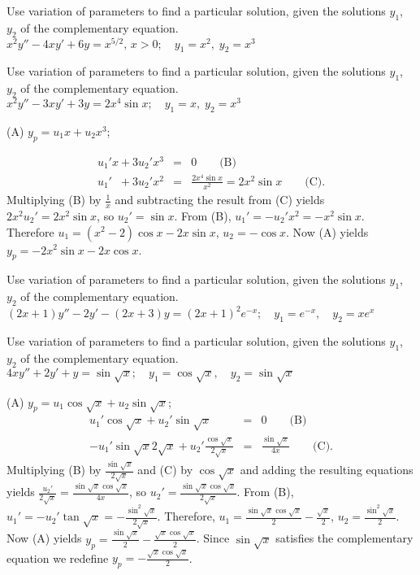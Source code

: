 \documentclass{ximera}
\begin{document}
\begin{problem}\label{exer:5.7.11}
Use variation
of parameters to find a particular solution, given the solutions
$y_1$, $y_2$ of the complementary equation. $x^2y''-4xy'+6y=x^{5/2},\, x > 0;\quad  y_1=x^2,\;  y_2=x^3$
\end{problem}

\begin{problem}\label{exer:5.7.12}
Use variation
of parameters to find a particular solution, given the solutions
$y_1$, $y_2$ of the complementary equation. $x^2y''-3xy'+3y=2x^4\sin x; \quad  y_1=x,\;  y_2=x^3$

\begin{solution}
(A) $y_p=u_1x+u_2x^3$;

\begin{eqnarray*}
u_1'x+3u_2'x^3&=&0\qquad\text{(B)}\\ %
u_1'\phantom{x}+3u_2'x^2&=&\frac{2x^4\sin x}{x^2}=2x^2\sin x \qquad\text{(C)}. %
\end{eqnarray*}
Multiplying (B) by $\frac{1}{x}$ and subtracting
the result from (C) yields $2x^2u_2'=2x^2\sin x$, so
$u_2'=\sin x$. From (B), $u_1'=-u_2'x^2=-x^2\sin x$.
Therefore $u_1=(x^2-2)\cos x-2x\sin x$, $u_2=-\cos x$. Now (A) yields
$y_p=-2x^2\sin x-2x\cos x$.
\end{solution}
\end{problem}

\begin{problem}\label{exer:5.7.13}
Use variation
of parameters to find a particular solution, given the solutions
$y_1$, $y_2$ of the complementary equation. $(2x+1)y''-2y'-(2x+3)y=(2x+1)^2e^{-x}; \quad  y_1=e^{-x},
\quad y_2=xe^x$
\end{problem}

\begin{problem}\label{exer:5.7.14}
Use variation
of parameters to find a particular solution, given the solutions
$y_1$, $y_2$ of the complementary equation. $4xy''+2y'+y=\sin\sqrt x; \quad  y_1=\cos\sqrt x,
\quad y_2=\sin\sqrt x$

\begin{solution}
    (A) $y_p=u_1\cos\sqrt x+u_2\sin\sqrt x$;
\setcounter{equation}{1}
\begin{eqnarray*}
u_1'\cos\sqrt x+u_2'\sin\sqrt x&=&0\qquad\text{(B)}\\ %
-u_1'{\sin\sqrt x}{2\sqrt
x}+u_2'\frac{\cos\sqrt x}{2\sqrt x}&=&\frac{\sin\sqrt x}{4x}\qquad\text{(C)}.
\end{eqnarray*}
Multiplying (B) by $\frac{\sin\sqrt x}{2\sqrt x}$
and (C) by $\cos\sqrt x$ and adding the resulting
equations yields $\frac{u_2'}{2\sqrt x}=\frac{\sin\sqrt x\cos\sqrt
x}{4x}$, so $u_2'=\frac{\sin\sqrt x\cos\sqrt x}{2\sqrt x}$. From
(B), $u_1'=-u_2'\tan\sqrt x=-\frac{\sin^2\sqrt
x}{2\sqrt x}$. Therefore, $u_1=\frac{\sin\sqrt x\cos\sqrt
x}{2}-\frac{\sqrt x}{2}$, $u_2=\frac{\sin^2\sqrt x}{2}$. Now
(A) yields $y_p=\frac{\sin\sqrt x}{2}-\frac{\sqrt x\cos\sqrt
x}{2}$. Since $\sin\sqrt x$ satisfies the complementary equation we
redefine $y_p=-\frac{\sqrt x\cos\sqrt x}{2}$.
\end{solution}
\end{problem}
\end{document}
